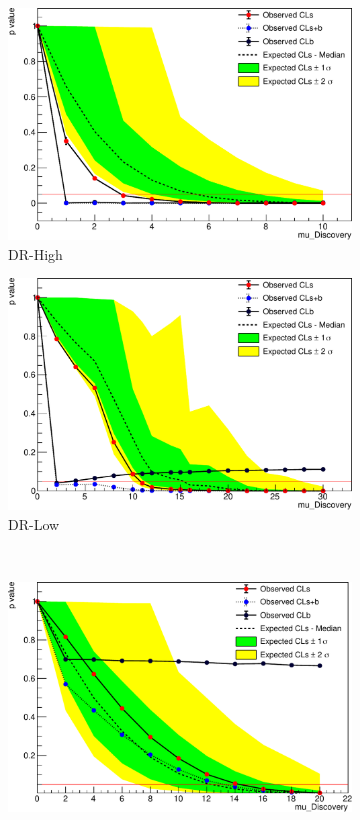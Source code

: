 \begin{figure}[tp]
\centering
\begin{subfigure}{0.495\textwidth}
\centering
\includegraphics[width=\textwidth]{figures/2ljets_upper_limit_scan_drhigh.pdf}
\caption{DR-High}
\end{subfigure}
\hfill
\begin{subfigure}{0.495\textwidth}
\centering
\includegraphics[width=\textwidth]{figures/2ljets_upper_limit_scan_drlow.pdf}
\caption{DR-Low}
\end{subfigure}
\\[1.5ex]
\begin{subfigure}{0.495\textwidth}
\centering
\includegraphics[width=\textwidth]{figures/2ljets_upper_limit_scan_droffshell.pdf}

\end{subfigure}
\end{figure}

